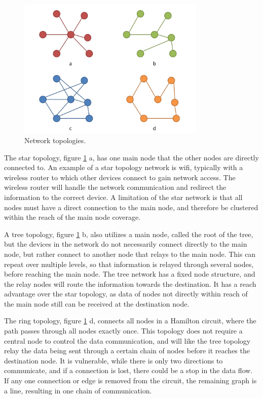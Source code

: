 \begin{figure}[h!]
	\centering
	\includegraphics[width=0.8\textwidth]{figures/topologies.png}
	\caption{Network topologies.}
	\label{fig:topologies}
\end{figure}

The star topology, figure \ref{fig:topologies} a, has one main node that the other nodes are directly connected to. An example of a star topology network is wifi, typically with a wireless router to which other devices connect to gain network access. The wireless router will handle the network communication and redirect the information to the correct device. A limitation of the star network is that all nodes must have a direct connection to the main node, and therefore be clustered within the reach of the main node coverage. 

A tree topology, figure \ref{fig:topologies} b, also utilizes a main node, called the root of the tree, but the devices in the network do not necessarily connect directly to the main node, but rather connect to another node that relays to the main node. This can repeat over multiple levels, so that information is relayed through several nodes, before reaching the main node. The tree network has a fixed node structure, and the relay nodes will route the information towards the destination.  It has a reach advantage over the star topology, as data of nodes not directly within reach of the main node still can be received at the destination node.

The ring topology, figure \ref{fig:topologies} d, connects all nodes in a Hamilton circuit, where the path passes through all nodes exactly once. This topology does not require a central node to control the data communication, and will like the tree topology relay the data being sent through a certain chain of nodes before it reaches the destination node. It is vulnerable, while there is only two directions to communicate, and if a connection is lost, there could be a stop  in the data flow. If any one connection or edge is removed from the circuit, the remaining graph is a line, resulting in one chain of communication.

